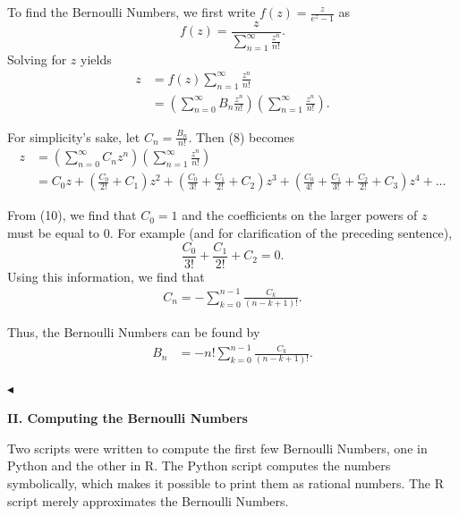 \documentclass{article}
\begin{document}
\vspace{3mm}

\noindent To find the Bernoulli Numbers, we first write $f(z) = \frac{z}{e^z - 1}$ as $$f(z) = \frac{z}{\sum\limits_{n=1}^{\infty}\frac{z^n}{n!}}.$$ Solving for $z$ yields
\begin{align}
z &= f(z)\sum\limits_{n=1}^{\infty}\frac{z^n}{n!} \\
&= \left(\sum\limits_{n=0}^{\infty}B_n\frac{z^n}{n!}\right)\left(\sum\limits_{n=1}^{\infty}\frac{z^n}{n!}\right).
\end{align}

\noindent For simplicity's sake, let $C_n = \frac{B_n}{n!}$.  Then (8) becomes 
\pagebreak
\begin{align}
z &= \left(\sum\limits_{n=0}^{\infty}C_n z^n\right)\left(\sum\limits_{n=1}^{\infty}\frac{z^n}{n!}\right) \\
&= C_0z + \left(\frac{C_0}{2!} + C_1\right)z^2 + \left(\frac{C_0}{3!} + \frac{C_1}{2!} + C_2\right)z^3 + \left(\frac{C_0}{4!} + \frac{C_1}{3!} + \frac{C_2}{2!} + C_3\right)z^4 + \ldots 
\end{align}

\noindent From (10), we find that $C_0 = 1$ and the coefficients on the larger powers of $z$ must be equal to $0$.  For example (and for clarification of the preceding sentence), $$\frac{C_0}{3!} + \frac{C_1}{2!} + C_2 = 0.$$ Using this information, we find that 
\begin{align}
C_n = -\sum\limits_{k = 0}^{n-1}\frac{C_k}{(n-k+1)!}.
\end{align}

\noindent Thus, the Bernoulli Numbers can be found by 
\begin{align}
B_n &= -n!\sum\limits_{k=0}^{n-1}\frac{C_k}{(n-k+1)!}.
\end{align}

\hfill$\blacktriangleleft$

\pagebreak

\noindent\begin{Large}\textbf{II. Computing the Bernoulli Numbers}\end{Large}

\noindent Two scripts were written to compute the first few Bernoulli Numbers, one in Python and the other in R.  The Python script computes the numbers symbolically, which makes it possible to print them as rational numbers.  The R script merely approximates the Bernoulli Numbers.

\vspace{3mm}
\end{document}
